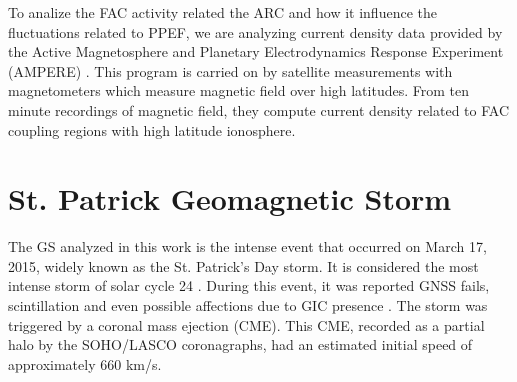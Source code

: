 \documentclass[a4paper]{article}
\theoremstyle{plain}
\theoremstyle{definition}
\begin{document}
	
	To analize the FAC activity related the ARC and how it influence the fluctuations related to PPEF, we are analyzing current density data provided by the Active Magnetosphere and Planetary Electrodynamics Response Experiment (AMPERE) \citep{AMPERE}. This program is carried on by satellite measurements with magnetometers which measure magnetic field over high latitudes. From ten minute recordings of magnetic field, they compute current density related to FAC coupling regions with high latitude ionosphere.\\
	
	
	
	\section{St. Patrick Geomagnetic Storm}
	
	The GS analyzed in this work is the intense event that occurred on March 17, 2015, widely known as the St. Patrick's Day storm. It is considered the most intense storm of solar cycle 24 \citep{stpatrick_ref}. During this event, it was reported GNSS fails, scintillation and even possible affections due to GIC presence \citep{st_patric_effects_rusia}. The storm was triggered by a coronal mass ejection (CME). This CME, recorded as a partial halo by the SOHO/LASCO coronagraphs, had an estimated initial speed of approximately 660 km/s.\\
\end{document}
